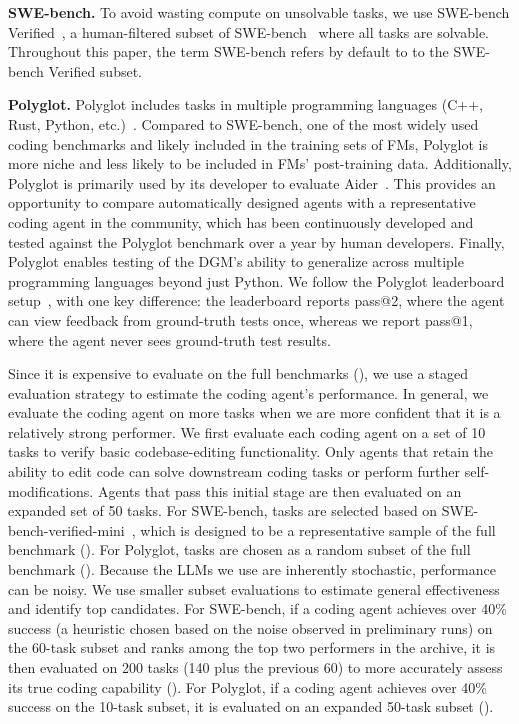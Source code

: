 \documentclass{article}
\begin{document}
\textbf{SWE-bench.} To avoid wasting compute on unsolvable tasks, we use SWE-bench Verified~\citep{openai2024sweverified}, a human-filtered subset of SWE-bench~\citep{jimenez2024swebench} where all tasks are solvable. Throughout this paper, the term SWE-bench refers by default to to the SWE-bench Verified subset.

\textbf{Polyglot.} Polyglot includes tasks in multiple programming languages (C++, Rust, Python, etc.)~\citep{gauthier2024polyglot}. Compared to SWE-bench, one of the most widely used coding benchmarks and likely included in the training sets of FMs, Polyglot is more niche and less likely to be included in FMs' post-training data. Additionally, Polyglot is primarily used by its developer to evaluate Aider~\citep{aider2024}. This provides an opportunity to compare automatically designed agents with a representative coding agent in the community, which has been continuously developed and tested against the Polyglot benchmark over a year by human developers. Finally, Polyglot enables testing of the DGM's ability to generalize across multiple programming languages beyond just Python. We follow the Polyglot leaderboard setup~\citep{gauthier2024polyglot}, with one key difference: the leaderboard reports pass@2, where the agent can view feedback from ground-truth tests once, whereas we report pass@1, where the agent never sees ground-truth test results.

Since it is expensive to evaluate on the full benchmarks (), we use a staged evaluation strategy to estimate the coding agent's performance. In general, we evaluate the coding agent on more tasks when we are more confident that it is a relatively strong performer. We first evaluate each coding agent on a set of 10 tasks to verify basic codebase-editing functionality. Only agents that retain the ability to edit code can solve downstream coding tasks or perform further self-modifications. Agents that pass this initial stage are then evaluated on an expanded set of 50 tasks. For SWE-bench, tasks are selected based on SWE-bench-verified-mini~\citep{hobbhahn2025swebenchmini}, which is designed to be a representative sample of the full benchmark (). For Polyglot, tasks are chosen as a random subset of the full benchmark (). Because the LLMs we use are inherently stochastic, performance can be noisy. We use smaller subset evaluations to estimate general effectiveness and identify top candidates. For SWE-bench, if a coding agent achieves over 40\% success (a heuristic chosen based on the noise observed in preliminary runs) on the 60-task subset and ranks among the top two performers in the archive, it is then evaluated on 200 tasks (140 plus the previous 60) to more accurately assess its true coding capability (). For Polyglot, if a coding agent achieves over 40\% success on the 10-task subset, it is evaluated on an expanded 50-task subset ().
\end{document}
